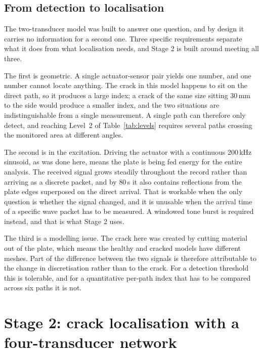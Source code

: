\subsection{From detection to localisation}

The two-transducer model was built to answer one question, and by design it carries no information for a
second one. Three specific requirements separate what it does from what localisation needs, and Stage 2 is
built around meeting all three.

The first is geometric. A single actuator-sensor pair yields one number, and one number cannot locate
anything. The crack in this model happens to sit on the direct path, so it produces a large index; a crack of
the same size sitting 30\,mm to the side would produce a smaller index, and the two situations are
indistinguishable from a single measurement. A single path can therefore only detect, and reaching Level~2
of Table~\ref{tab:levels} requires several paths crossing the monitored area at different angles.

The second is in the excitation. Driving the actuator with a continuous 200\,kHz sinusoid, as was done here,
means the plate is being fed energy for the entire analysis. The received signal grows steadily throughout
the record rather than arriving as a discrete packet, and by $80$\,\textmu s it also contains reflections from
the plate edges superposed on the direct arrival. That is workable when the only question is whether the
signal changed, and it is unusable when the arrival time of a specific wave packet has to be measured. A
windowed tone burst is required instead, and that is what Stage 2 uses.

The third is a modelling issue. The crack here was created by cutting material out of the plate, which
means the healthy and cracked models have different meshes. Part of the difference between the two signals
is therefore attributable to the change in discretisation rather than to the crack. For a detection threshold
this is tolerable, and for a quantitative per-path index that has to be compared across six paths it is not.

\section{Stage 2: crack localisation with a four-transducer network}
\label{sec:stage2}

